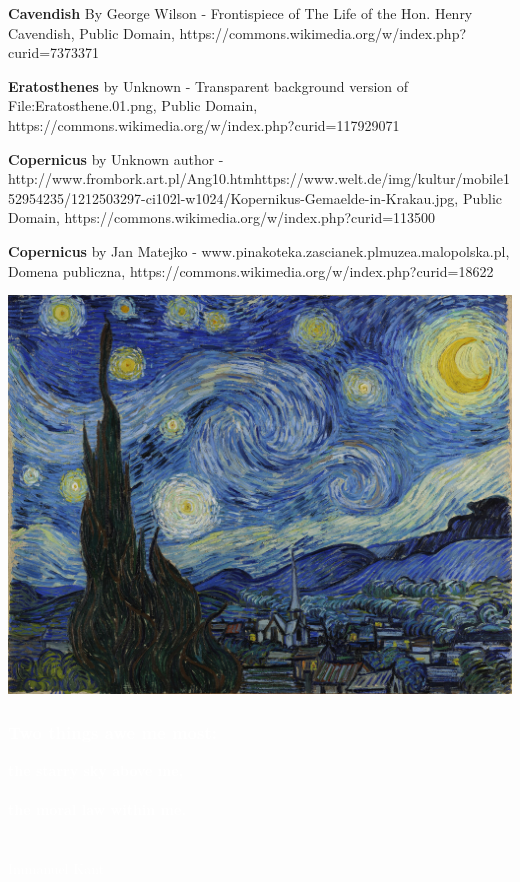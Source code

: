 \documentclass[aspectratio=169,xcolor=pdftex,dvipsnames]{beamer} %
\begin{document}
\begin{frame}
{\textbf{Cavendish} By George Wilson - Frontispiece of The Life of the Hon. Henry Cavendish, Public Domain, https://commons.wikimedia.org/w/index.php?curid=7373371

\textbf{Eratosthenes} by Unknown - Transparent background version of File:Eratosthene.01.png, Public Domain, https://commons.wikimedia.org/w/index.php?curid=117929071

\textbf{Copernicus} by Unknown author - http://www.frombork.art.pl/Ang10.htmhttps://www.welt.de/img/kultur/mobile152954235/1212503297-ci102l-w1024/Kopernikus-Gemaelde-in-Krakau.jpg, Public Domain, https://commons.wikimedia.org/w/index.php?curid=113500

\textbf{Copernicus} by Jan Matejko - www.pinakoteka.zascianek.plmuzea.malopolska.pl, Domena publiczna, https://commons.wikimedia.org/w/index.php?curid=18622
}

\end{frame}

{
{
    \includegraphics[width=\paperwidth]{vanGoghStarryNight.jpg}
}
\begin{frame}
\frametitle{\textcolor{white}{\textbf{Two things awe me most:}}}
 
 \textcolor{white}{
{\Huge\textbf{the starry sky above me,\\ \ \\
the moral law within me.}
\ \\ \ \\ \ \\
Immanuel Kant
}}

\end{frame}
}


\end{document}
